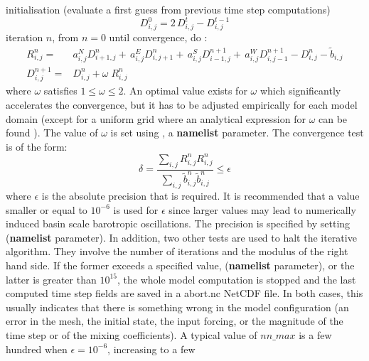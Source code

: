 initialisation (evaluate a first guess from previous time step computations)
\begin{equation}
D_{i,j}^0 = 2 \, D_{i,j}^t - D_{i,j}^{t-1}
\end{equation}
iteration $n$, from $n=0$ until convergence, do :
\begin{equation} \label{Eq_sor_algo}
\begin{split}
R_{i,j}^n  = &a_{i,j}^{N} D_{i+1,j}^n       +\,a_{i,j}^{E}  D_{i,j+1} ^n	    	
			+\, a_{i,j}^{S}  D_{i-1,j} ^{n+1}+\,a_{i,j}^{W} D_{i,j-1} ^{n+1}
                 -  D_{i,j}^n - \tilde{b}_{i,j}                                           \\
D_{i,j} ^{n+1}  = &D_{i,j} ^{n}   + \omega \;R_{i,j}^n     
\end{split}
\end{equation}
where \textit{$\omega $ }satisfies $1\leq \omega \leq 2$. An optimal value exists for 
\textit{$\omega$} which significantly accelerates the convergence, but it has to be 
adjusted empirically for each model domain (except for a uniform grid where an 
analytical expression for \textit{$\omega$} can be found \citep{Richtmyer1967}). 
The value of $\omega$ is set using , a \textbf{namelist} parameter. 
The convergence test is of the form:
\begin{equation}
\delta = \frac{\sum\limits_{i,j}{R_{i,j}^n}{R_{i,j}^n}}
                    {\sum\limits_{i,j}{ \tilde{b}_{i,j}^n}{\tilde{b}_{i,j}^n}} \leq \epsilon
\end{equation}
where $\epsilon$ is the absolute precision that is required. It is recommended 
that a value smaller or equal to $10^{-6}$ is used for $\epsilon$ since larger 
values may lead to numerically induced basin scale barotropic oscillations. 
The precision is specified by setting  (\textbf{namelist} parameter). 
In addition, two other tests are used to halt the iterative algorithm. They involve 
the number of iterations and the modulus of the right hand side. If the former 
exceeds a specified value,  (\textbf{namelist} parameter), 
or the latter is greater than $10^{15}$, the whole model computation is stopped 
and the last computed time step fields are saved in a abort.nc NetCDF file. 
In both cases, this usually indicates that there is something wrong in the model 
configuration (an error in the mesh, the initial state, the input forcing, 
or the magnitude of the time step or of the mixing coefficients). A typical value of 
$nn\_max$ is a few hundred when $\epsilon = 10^{-6}$, increasing to a few 
